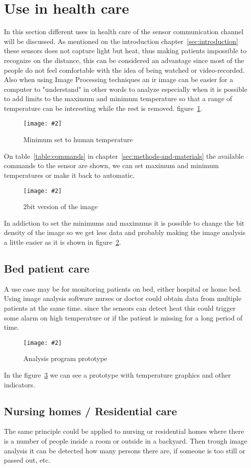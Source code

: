 \documentclass[hidelinks,11pt,a4paper,oneside,article]{memoir}
\newcommand{\putimage}[3][10] %
{
\begin{figure}[h]
	\centering
	\captionsetup{justification=centering}
	\texttt{[image: \#2]}
	\caption{#3}
	\label{fig:#2}
\end{figure}
}
\begin{document}
\section{Use in health care}
In this section different uses in health care of the sensor communication channel will be discussed. As mentioned on the introduction chapter~\ref{sec:introduction} these sensors does not capture light but heat, thus making patients impossible to recognize on the distance, this can be considered an advantage since most of the people do not feel comfortable with the idea of being watched or video-recorded. Also when using Image Processing techniques an \gls{ir} image can be easier for a computer to "understand" in other words to analyze especially when it is possible to add limits to the maximum and minimum temperature so that a range of temperature can be interesting while the rest is removed. figure~\ref{fig:setminimum}.
    
    \putimage{setminimum}{Minimum set to human temperature}

On table~\ref{table:commands} in chapter~\ref{sec:methods-and-materials} the available commands to the sensor are shown, we can set maximum and minimum temperatures or make it back to automatic.

    \putimage{2bit}{2bit version of the image}

In addiction to set the minimums and maximums it is possible to change the bit density of the image so we get less data and probably making the image analysis a little easier as it is shown in figure~\ref{fig:2bit}.

\subsection{Bed patient care}
A use case may be for monitoring patients on bed, either hospital or home bed. Using image analysis software nurses or doctor could obtain data from multiple patients at the same time. since the sensors can detect heat this could trigger some alarm on high temperature or if the patient is missing for a long period of time.

    \putimage{fiber-detector-prototype}{Analysis program prototype}
    
In the figure~\ref{fig:fiber-detector-prototype} we can see a prototype with temperature graphics and other indicators.
    
\subsection{Nursing homes / Residential care}
The same principle could be applied to nursing or residential homes where there is a number of people inside a room or outside in a backyard. Then trough image analysis it can be detected how many persons there are, if someone is too still or passed out, etc.
\end{document}
